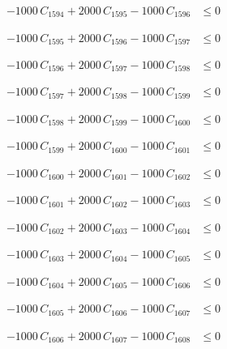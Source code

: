 \documentclass[a4paper,11pt]{article}
\begin{document}
\begin{align}
-1000\,C_{1594} + 2000\,C_{1595} - 1000\,C_{1596} &\leq 0 \nonumber
\end{align}

\begin{align}
-1000\,C_{1595} + 2000\,C_{1596} - 1000\,C_{1597} &\leq 0 \nonumber
\end{align}

\begin{align}
-1000\,C_{1596} + 2000\,C_{1597} - 1000\,C_{1598} &\leq 0 \nonumber
\end{align}

\begin{align}
-1000\,C_{1597} + 2000\,C_{1598} - 1000\,C_{1599} &\leq 0 \nonumber
\end{align}

\begin{align}
-1000\,C_{1598} + 2000\,C_{1599} - 1000\,C_{1600} &\leq 0 \nonumber
\end{align}

\begin{align}
-1000\,C_{1599} + 2000\,C_{1600} - 1000\,C_{1601} &\leq 0 \nonumber
\end{align}

\begin{align}
-1000\,C_{1600} + 2000\,C_{1601} - 1000\,C_{1602} &\leq 0 \nonumber
\end{align}

\begin{align}
-1000\,C_{1601} + 2000\,C_{1602} - 1000\,C_{1603} &\leq 0 \nonumber
\end{align}

\begin{align}
-1000\,C_{1602} + 2000\,C_{1603} - 1000\,C_{1604} &\leq 0 \nonumber
\end{align}

\begin{align}
-1000\,C_{1603} + 2000\,C_{1604} - 1000\,C_{1605} &\leq 0 \nonumber
\end{align}

\begin{align}
-1000\,C_{1604} + 2000\,C_{1605} - 1000\,C_{1606} &\leq 0 \nonumber
\end{align}

\begin{align}
-1000\,C_{1605} + 2000\,C_{1606} - 1000\,C_{1607} &\leq 0 \nonumber
\end{align}

\begin{align}
-1000\,C_{1606} + 2000\,C_{1607} - 1000\,C_{1608} &\leq 0 \nonumber
\end{align}
\end{document}

